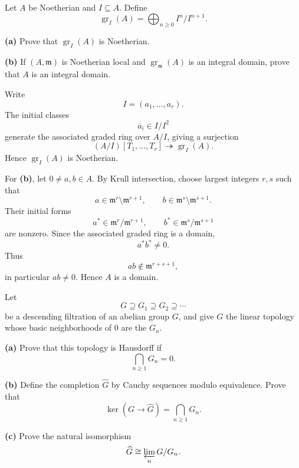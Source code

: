 \begin{problem}[CP-V-0053]
\label{prob:cp-v-0053}
Let \(A\) be Noetherian and \(I\subseteq A\). Define
\[
\operatorname{gr}_I(A)
=
\bigoplus_{n\ge0}I^n/I^{n+1}.
\]

\textbf{(a)} Prove that \(\operatorname{gr}_I(A)\) is Noetherian.

\textbf{(b)} If \((A,\mathfrak m)\) is Noetherian local and
\(\operatorname{gr}_{\mathfrak m}(A)\) is an integral domain, prove that
\(A\) is an integral domain.
\end{problem}

\begin{solution}
Write
\[
I=(a_1,\dots,a_r).
\]
The initial classes
\[
\overline a_i\in I/I^2
\]
generate the associated graded ring over \(A/I\), giving a surjection
\[
(A/I)[T_1,\dots,T_r]\twoheadrightarrow\operatorname{gr}_I(A).
\]
Hence \(\operatorname{gr}_I(A)\) is Noetherian.

For \textbf{(b)}, let \(0\ne a,b\in A\). By Krull intersection, choose
largest integers \(r,s\) such that
\[
a\in\mathfrak m^r\setminus\mathfrak m^{r+1},
\qquad
b\in\mathfrak m^s\setminus\mathfrak m^{s+1}.
\]
Their initial forms
\[
a^*\in\mathfrak m^r/\mathfrak m^{r+1},
\qquad
b^*\in\mathfrak m^s/\mathfrak m^{s+1}
\]
are nonzero. Since the associated graded ring is a domain,
\[
a^*b^*\ne0.
\]
Thus
\[
ab\notin\mathfrak m^{r+s+1},
\]
in particular \(ab\ne0\). Hence \(A\) is a domain.
\end{solution}


\begin{problem}[CP-V-0054]
\label{prob:cp-v-0054}
Let
\[
G\supseteq G_1\supseteq G_2\supseteq\cdots
\]
be a descending filtration of an abelian group \(G\), and give \(G\) the
linear topology whose basic neighborhoods of \(0\) are the \(G_n\).

\textbf{(a)} Prove that this topology is Hausdorff if
\[
\bigcap_{n\ge1}G_n=0.
\]

\textbf{(b)} Define the completion \(\widehat G\) by Cauchy sequences modulo
equivalence. Prove that
\[
\ker(G\to\widehat G)=\bigcap_{n\ge1}G_n.
\]

\textbf{(c)} Prove the natural isomorphism
\[
\widehat G\cong\varprojlim_n G/G_n.
\]
\end{problem}


